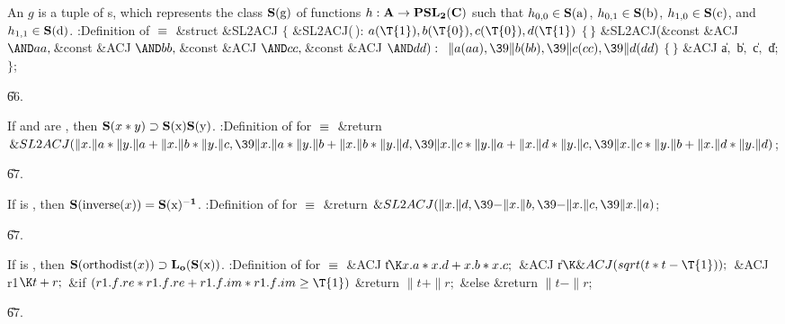An  $g$ is a tuple  of s,
which represents the class $\bf S(\hbox{g})$ of functions
$h : \bf A \rightarrow \bf PSL_2(\bf C)$
such that $h_{0,0} \in \bf S(\hbox{a})$, $h_{0,1} \in \bf S(\hbox{b})$,
$h_{1,0} \in \bf S(\hbox{c})$, and $h_{1,1} \in \bf S(\hbox{d})$.
\Y\B\4:Definition of \X${}\equiv{}$\6
\&{struct} \&{SL2ACJ} ${}\{{}$\1\6
\4\&{SL2ACJ}(\,):\5
${}\|a(\T{1}),\39\|b(\T{0}),\39\|c(\T{0}),\39\|d(\T{1}){}$\1\1\2\2\6
${}\{\,\}{}$\7
\4\&{SL2ACJ}(\&{const} \&{ACJ} ${}{\AND}\\{aa},\39{}$\&{const} \&{ACJ} ${}{%
\AND}\\{bb},\39{}$\&{const} \&{ACJ} ${}{\AND}\\{cc},\39{}$\&{const} \&{ACJ}
${}{\AND}\\{dd}):{}$\5
${}\|a(\\{aa}),\39\|b(\\{bb}),\39\|c(\\{cc}),\39\|d(\\{dd}){}$\1\1\2\2\6
${}\{\,\}{}$\7
\&{ACJ} \|a${},{}$ \|b${},{}$ \|c${},{}$ \|d;\2\6
${}\}{}$;\par
\U66.\fi

If  and  are , then
$\reps{\PB{$\|x*\|y$}} \supset \reps{x} \reps{y}$.
\endproposition
\Y\B\4:Definition of  for \X${}%
\E{}$\6
\&{return} ${}\&{SL2ACJ}(\|x.\|a*\|y.\|a+\|x.\|b*\|y.\|c,\39\|x.\|a*\|y.\|b+%
\|x.\|b*\|y.\|d,\39\|x.\|c*\|y.\|a+\|x.\|d*\|y.\|c,\39\|x.\|c*\|y.\|b+\|x.\|d*%
\|y.\|d){}$;\par
\U67.\fi

If  is , then
\endproposition
$\reps{\PB{\\{inverse}(\|x)}} = \reps{x}^{-1}$.
\Y\B\4:Definition of  for \X${}%
\E{}$\6
\&{return} ${}\&{SL2ACJ}(\|x.\|d,\39{-}\|x.\|b,\39{-}\|x.\|c,\39\|x.\|a){}$;\par
\U67.\fi

If  is , then
\endproposition
$\reps{\PB{\\{orthodist}(\|x)}} \supset \olength{\reps{x}}$.
\Y\B\4:Definition of  for \X${}%
\E{}$\6
\&{ACJ} \|t${}\K\|x.\|a*\|x.\|d+\|x.\|b*\|x.\|c;{}$\6
\&{ACJ} \|r${}\K\&{ACJ}(\\{sqrt}(\|t*\|t-\T{1}));{}$\6
\&{ACJ} \\{r1}${}\K\|t+\|r;{}$\7
\&{if} ${}(\\{r1}.\|f.\\{re}*\\{r1}.\|f.\\{re}+\\{r1}.\|f.\\{im}*\\{r1}.\|f.%
\\{im}\G\T{1}){}$\1\5
\&{return} ${}\|t+\|r;{}$\2\6
\&{else}\1\5
\&{return} ${}\|t-\|r{}$;\2\par
\U67.\fi

